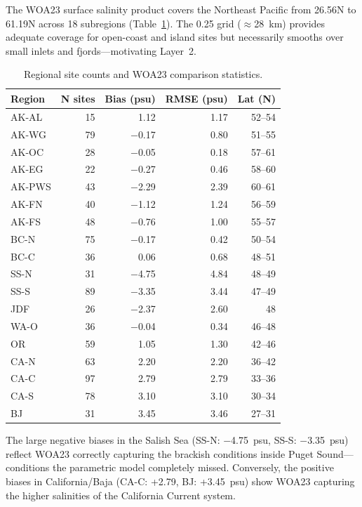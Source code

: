 \documentclass[11pt,letterpaper]{article}
\begin{document}
The WOA23 surface salinity product covers the Northeast Pacific from
26.56\textdegree{}N to 61.19\textdegree{}N across 18 subregions
(Table~\ref{tab:regions}). The 0.25\textdegree{} grid ($\approx$28~km)
provides adequate coverage for open-coast and island sites but
necessarily smooths over small inlets and fjords---motivating Layer~2.

\begin{table}[H]
\centering
\caption{Regional site counts and WOA23 comparison statistics.}
\label{tab:regions}
\small
\begin{tabular}{lrrrr}
\toprule
\textbf{Region} & \textbf{N sites} & \textbf{Bias (psu)} & \textbf{RMSE (psu)} & \textbf{Lat (\textdegree{}N)} \\
\midrule
AK-AL  &  15 &  1.12 & 1.17 & 52--54 \\
AK-WG  &  79 & $-$0.17 & 0.80 & 51--55 \\
AK-OC  &  28 & $-$0.05 & 0.18 & 57--61 \\
AK-EG  &  22 & $-$0.27 & 0.46 & 58--60 \\
AK-PWS &  43 & $-$2.29 & 2.39 & 60--61 \\
AK-FN  &  40 & $-$1.12 & 1.24 & 56--59 \\
AK-FS  &  48 & $-$0.76 & 1.00 & 55--57 \\
BC-N   &  75 & $-$0.17 & 0.42 & 50--54 \\
BC-C   &  36 &  0.06 & 0.68 & 48--51 \\
SS-N   &  31 & $-$4.75 & 4.84 & 48--49 \\
SS-S   &  89 & $-$3.35 & 3.44 & 47--49 \\
JDF    &  26 & $-$2.37 & 2.60 & 48 \\
WA-O   &  36 & $-$0.04 & 0.34 & 46--48 \\
OR     &  59 &  1.05 & 1.30 & 42--46 \\
CA-N   &  63 &  2.20 & 2.20 & 36--42 \\
CA-C   &  97 &  2.79 & 2.79 & 33--36 \\
CA-S   &  78 &  3.10 & 3.10 & 30--34 \\
BJ     &  31 &  3.45 & 3.46 & 27--31 \\
\bottomrule
\end{tabular}
\end{table}

\noindent The large negative biases in the Salish Sea (SS-N: $-$4.75~psu,
SS-S: $-$3.35~psu) reflect WOA23 correctly capturing the brackish
conditions inside Puget Sound---conditions the parametric model
completely missed. Conversely, the positive biases in California/Baja
(CA-C: +2.79, BJ: +3.45~psu) show WOA23 capturing the higher salinities
of the California Current system.
\end{document}
